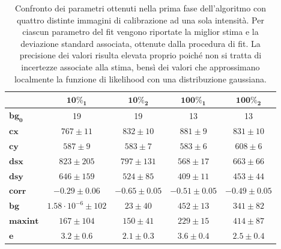 \begin{table}
 \begin{center}
\begin{small}
\begin{tabular}{lcccc}
\hline\hline
&$\mathbf{10\%_1}$&$\mathbf{10\%_2}$&$\mathbf{100\%_1}$&$\mathbf{100\%_2}$\\
\hline
$\mathbf{bg_0}$& 19 & 19 & 13 & 13\\
\hline
$\mathbf{cx}$&$767\pm11$&$832\pm10$&$881\pm9$&$831\pm10$\\
$\mathbf{cy}$&$587\pm9$&$583\pm7$&$583\pm6 $&$608\pm6$\\
$\mathbf{dsx}$&$823\pm205$&$ 797\pm131$&$568 \pm17$&$663\pm66$\\
$\mathbf{dsy}$&$646\pm159$&$524\pm85$&$ 409\pm11$&$453\pm44$\\
$\mathbf{corr}$&$-0.29\pm0.06$&$-0.65\pm0.05 $&$-0.51\pm0.05$&$-0.49\pm0.05$\\
$\mathbf{bg}$&$1.58\cdot 10^{-6}\pm102$&$23\pm40 $&$452\pm13$&$341\pm82$\\
$\mathbf{maxint}$&$167\pm104$&$150\pm41$&$229\pm15$&$414\pm87$\\
$\mathbf{e}$&$3.2\pm0.6$&$2.1\pm0.3$&$3.6\pm0.4$&$2.5\pm0.4$\\
\hline\hline
\end{tabular}
\caption{\small{Confronto dei parametri ottenuti nella prima fase dell'algoritmo con quattro distinte immagini di calibrazione ad una sola intensità. Per ciascun parametro del fit vengono riportate la miglior stima e la deviazione standard associata, ottenute dalla procedura di fit. La precisione dei valori risulta elevata proprio poiché non si tratta di incertezze associate alla stima, bensì dei valori che approssimano localmente la funzione di likelihood con una distribuzione gaussiana.}}
\label{TABris}
\end{small}
\end{center}
\end{table}

